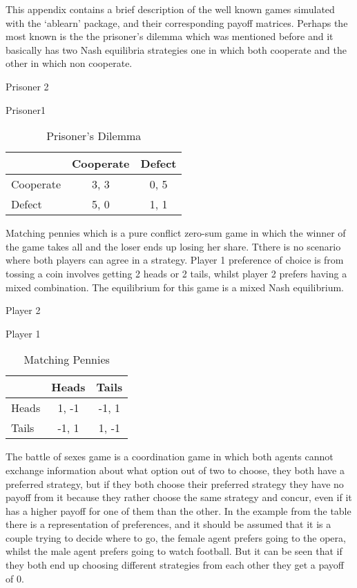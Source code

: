 \label{app:gamesused}
This appendix contains a brief description of the well known games simulated with the `ablearn' package, and their corresponding payoff matrices.
Perhaps the most known is the the prisoner's dilemma which was mentioned before and it basically has two Nash equilibria strategies one in which both cooperate and the other in which non cooperate.

\begin{table}[h]
\begin{center}
Prisoner 2

Prisoner1
\begin{tabular}{|l|c|c|}
\hline
 & Cooperate & Defect \\ 
\hline
Cooperate & 3, 3 & 0, 5\\
\hline
 Defect & 5, 0 & 1, 1\\
\hline
\end{tabular}
\caption{Prisoner's Dilemma}
\label{tab:prisdiltag}
\end{center}
\end{table}


Matching pennies which is a pure conflict zero-sum game in which the winner of the game takes all and the loser ends up losing her share. Tthere is no scenario where both players can agree in a strategy. Player 1 preference of choice is from tossing a coin involves getting 2 heads or 2 tails, whilst player 2 prefers having a mixed combination.  The equilibrium for this game is a mixed Nash equilibrium.

\begin{table}[h]
\begin{center}
Player 2


Player 1
\begin{tabular}{|l|c|c|}
\hline
 & Heads & Tails \\ 
\hline
Heads & 1, -1 & -1, 1\\
\hline
 Tails & -1, 1 & 1, -1\\
\hline
\end{tabular}
\end{center}
\caption{Matching Pennies}
\label{tab:matpentag}
\end{table}


The battle of sexes game is a coordination game in which both agents cannot exchange information about what option out of two to choose, they both have a preferred strategy, but if they both choose their preferred strategy they have no payoff from it because they rather choose the same strategy and concur,  even if it has a higher payoff for one of them than the other. In the example from the table there is a representation of preferences, and it should be assumed that it is a couple trying to decide where to go, the female agent prefers going to the opera, whilst the male agent prefers going to watch football. But it can be seen that if they both end up choosing different strategies from each other they get a payoff of 0. 

